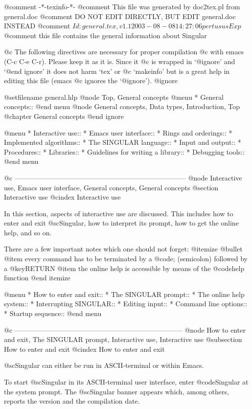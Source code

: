 @comment -*-texinfo-*-
@comment This file was generated by doc2tex.pl from general.doc
@comment DO NOT EDIT DIRECTLY, BUT EDIT general.doc INSTEAD
@comment $Id: general.tex,v 1.1 2003-08-08 14:27:06 pertusus Exp $
@comment this file contains the general information about Singular

@c The following directives are necessary for proper compilation
@c with emacs (C-c C-e C-r).  Please keep it as it is.  Since it
@c is wrapped in `@ignore' and `@end ignore' it does not harm `tex' or
@c `makeinfo' but is a great help in editing this file (emacs
@c ignores the `@ignore').
@ignore

@setfilename general.hlp
@node Top, General concepts
@menu
* General concepts::
@end menu
@node General concepts, Data types, Introduction, Top
@chapter General concepts
@end ignore

@menu
* Interactive use::
* Emacs user interface::
* Rings and orderings::
* Implemented algorithms::
* The SINGULAR language::
* Input and output::
* Procedures::
* Libraries::
* Guidelines for writing a library::
* Debugging tools::
@end menu


@c ---------------------------------------------------------------------------
@node Interactive use, Emacs user interface, General concepts, General concepts
@section Interactive use
@cindex Interactive use

In this section, aspects of interactive use are discussed.  This
includes how to enter and exit @sc{Singular}, how to interpret its
prompt, how to get the online help, and so on.

There are a few important notes which one should not forget:
@itemize @bullet
@item
every command has to be terminated by a @code{;} (semicolon) followed
by a @key{RETURN}
@item
the online help is accessible by means of the @code{help} function
@end itemize

@menu
* How to enter and exit::
* The SINGULAR prompt::
* The online help system::
* Interrupting SINGULAR::
* Editing input::
* Command line options::
* Startup sequence::
@end menu

@c --------------------------------------------------------------------------
@node How to enter and exit, The SINGULAR prompt, Interactive use, Interactive use
@subsection How to enter and exit
@cindex How to enter and exit

@sc{Singular} can either be run in ASCII-terminal or within Emacs.

To start @sc{Singular} in its ASCII-terminal user interface,  enter
@code{Singular} at the system prompt. The
@sc{Singular} banner appears which, among others, reports the version
and the compilation date.

